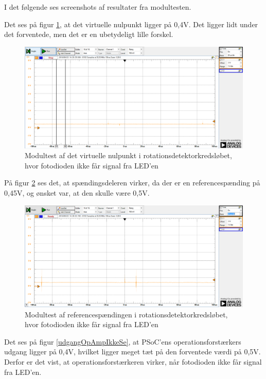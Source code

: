 I det følgende ses screenshots af resultater fra modultesten. 

Det ses på figur \ref{fig:virt0IkkeSe}, at det virtuelle nulpunkt ligger på 0,4V. Det ligger lidt under det forventede, men det er en ubetydeligt lille forskel. 

\begin{figure}[H]
	\centering
	\includegraphics[width=\textwidth]{Test/images/AffyringTest/IkkeSe/virtuelt_nul}
	\caption{Modultest af det virtuelle nulpunkt i rotationsdetektorkredsløbet, hvor fotodioden ikke får signal fra LED'en}
	\label{fig:virt0IkkeSe}
\end{figure}

På figur \ref{fig:spaendIkkeSe} ses det, at spændingsdeleren virker, da der er en referencespænding på 0,45V, og ønsket var, at den skulle være 0,5V. 

\begin{figure}[H]
	\centering
	\includegraphics[width=\textwidth]{Test/images/AffyringTest/IkkeSe/spaendingsdeler}
	\caption{Modultest af referencespændingen i rotationsdetektorkredsløbet, hvor fotodioden ikke får signal fra LED'en}
	\label{fig:spaendIkkeSe}
\end{figure}

Det ses på figur \ref{udgangOpAmpIkkeSe}, at PSoC'ens operationsforstærkers udgang ligger på 0,4V, hvilket ligger meget tæt på den forventede værdi på 0,5V. Derfor er det vist, at operationsforstærkeren virker, når fotodioden ikke får signal fra LED'en. 

